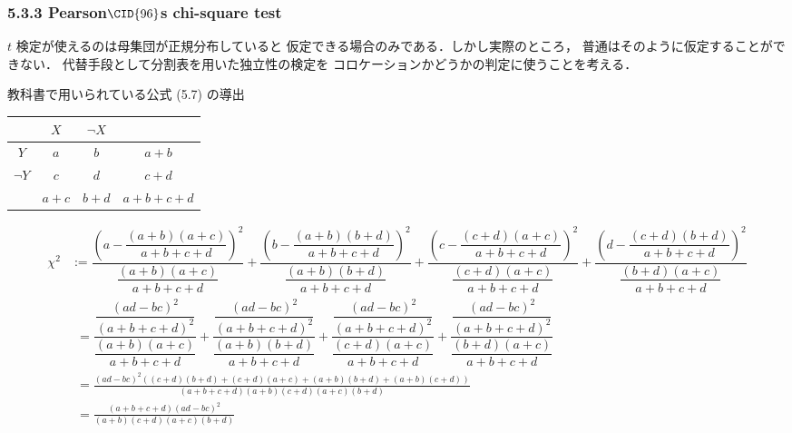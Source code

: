 \documentclass[9pt,leqno]{beamer}
\begin{document}
\begin{frame}
    \frametitle{5.3.3 Pearson$\text{\CID{96}}$s chi-square test}
    $t$ 検定が使えるのは母集団が正規分布していると
    仮定できる場合のみである．しかし実際のところ，
    普通はそのように仮定することができない．
    代替手段として分割表を用いた独立性の検定を
    コロケーションかどうかの判定に使うことを考える．

    \smallskip

    {\small 教科書で用いられている公式 (5.7) の導出}

    {\fontsize{6pt}{7.2}\selectfont
    \begin{table}
        \begin{center}
            \begin{tabular}{|c|c|c|c|}
                \hline
                          & $X$     & $\lnot X$ &     \\
                \hline
                $Y$       & $a$     & $b$       & $a + b$\\
                \hline
                $\lnot Y$ & $c$     & $d$       & $c + d$\\
                \hline
                          & $a + c$ & $b + d$   & $a + b + c + d$ \\
                \hline
            \end{tabular}
        \end{center}
    \end{table}
    }
    {\fontsize{6pt}{7.2}\selectfont
    \begin{align*}
        \chi^2 &:= \dfrac{\left(a - \dfrac{(a + b)(a + c)}{a + b + c + d}\right)^2}{\dfrac{(a + b)(a + c)}{a + b + c + d}}
                   + \dfrac{\left(b - \dfrac{(a + b)(b + d)}{a + b + c + d}\right)^2}{\dfrac{(a + b)(b + d)}{a + b + c + d}}
                   + \dfrac{\left(c - \dfrac{(c + d)(a + c)}{a + b + c + d}\right)^2}{\dfrac{(c + d)(a + c)}{a + b + c + d}}
                   + \dfrac{\left(d - \dfrac{(c + d)(b + d)}{a + b + c + d}\right)^2}{\dfrac{(b + d)(a + c)}{a + b + c + d}}\\
                   &\phantom{:}= \dfrac{\dfrac{(ad - bc)^2}{(a + b + c + d)^2}}{\dfrac{(a + b)(a + c)}{a + b + c + d}}
                   + \dfrac{\dfrac{(ad - bc)^2}{(a + b + c + d)^2}}{\dfrac{(a + b)(b + d)}{a + b + c + d}}
                   + \dfrac{\dfrac{(ad - bc)^2}{(a + b + c + d)^2}}{\dfrac{(c + d)(a + c)}{a + b + c + d}}
                   + \dfrac{\dfrac{(ad - bc)^2}{(a + b + c + d)^2}}{\dfrac{(b + d)(a + c)}{a + b + c + d}}\\
                   &\phantom{:}= \frac{(ad - bc)^2\left((c + d)(b + d) + (c + d)(a + c) + (a + b)(b + d) + (a + b)(c + d)\right)}{(a + b + c + d)(a + b)(c + d)(a + c)(b + d)} \\
                   &\phantom{:}= \frac{(a + b + c + d)(ad - bc)^2}{(a + b)(c + d)(a + c)(b + d)}
    \end{align*}
    }
\end{frame}
\end{document}
